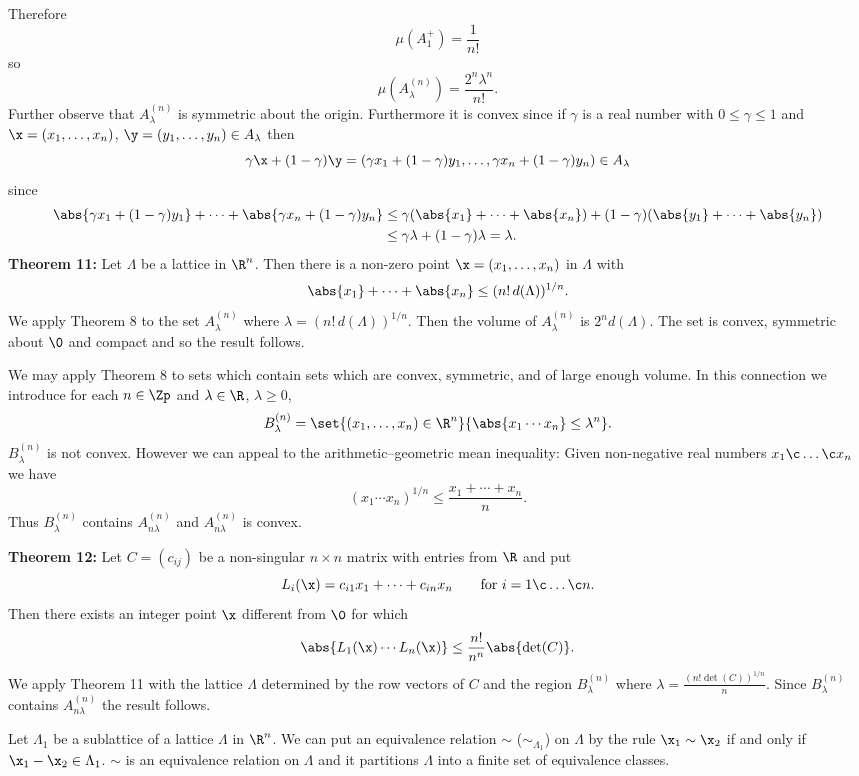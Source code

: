 Therefore
\[ \mu(A^+_1) = \frac{1}{n!} \]
so
\[ \mu(A^{(n)}_\lambda) = \frac{2^n\lambda^n}{n!} . \]
Further observe that $A^{(n)}_\lambda$ is symmetric about the origin.  Furthermore it is convex since if $\gamma$ is a real number with $0\leq\gamma\leq1$ and $\x=(x_1,\dotsc,x_n)$, $\y=(y_1,\dotsc,y_n)\in A_\lambda$ then
\[ \gamma\x+(1-\gamma)\y = (\gamma x_1+(1-\gamma)y_1,\dotsc,\gamma x_n+(1-\gamma)y_n) \in A_\lambda \]
since
\begin{align*}
\abs{\gamma x_1+(1-\gamma)y_1} + \dotsb + \abs{\gamma x_n+(1-\gamma)y_n} &\leq \gamma(\abs{x_1}+\dotsb+\abs{x_n}) + (1-\gamma)(\abs{y_1}+\dotsb+\abs{y_n}) \\
&\leq \gamma\lambda + (1-\gamma)\lambda = \lambda .
\end{align*}
\textbf{Theorem 11:} Let $\Lambda$ be a lattice in $\R^n$.  Then there is a non-zero point $\x=(x_1,\dotsc,x_n)$ in $\Lambda$ with
\[ \abs{x_1} + \dotsb + \abs{x_n} \leq (n!\, d(\Lambda))^{1/n} . \]
\pf We apply Theorem 8 to the set $A^{(n)}_\lambda$ where $\lambda=(n!\,d(\Lambda))^{1/n}$.  Then the volume of $A^{(n)}_\lambda$ is $2^n d(\Lambda)$.  The set is convex, symmetric about $\0$ and compact and so the result follows.

We may apply Theorem 8 to sets which contain sets which are convex, symmetric, and of large enough volume.  In this connection we introduce for each $n\in\Zp$ and $\lambda\in\R$, $\lambda\geq0$,
\[ B^{(n)}_\lambda = \set{(x_1,\dotsc,x_n)\in\R^n}{\abs{x_1\dotsm x_n}\leq\lambda^n} . \]
$B^{(n)}_\lambda$ is not convex.  However we can appeal to the arithmetic--geometric mean inequality: Given non-negative real numbers $x_1\c \dotsc\c x_n$ we have
\[ (x_1\dotsm x_n)^{1/n} \leq \frac{x_1+\dotsb+x_n}{n} . \]
Thus $B^{(n)}_\lambda$ contains $A^{(n)}_{n\lambda}$ and $A^{(n)}_{n\lambda}$ is convex.

\textbf{Theorem 12:} Let $C=(c_{ij})$ be a non-singular $n\times n$ matrix with entries from $\R$ and put
\[ L_i(\x) = c_{i1}x_1 + \dotsb + c_{in}x_n \qquad\text{for $i=1\c \dotsc\c n$} . \]
Then there exists an integer point $\x$ different from $\0$ for which
\[ \abs{L_1(\x)\dotsm L_n(\x)} \leq \frac{n!}{n^n} \abs{\det(C)} . \]
\pf We apply Theorem 11 with the lattice $\Lambda$ determined by the row vectors of $C$ and the region $B^{(n)}_\lambda$ where $\lambda=\frac{(n!\det(C))^{1/n}}{n}$.  Since $B^{(n)}_\lambda$ contains $A^{(n)}_{n\lambda}$ the result follows.

Let $\Lambda_1$ be a sublattice of a lattice $\Lambda$ in $\R^n$.  We can put an equivalence relation $\sim$ ($\sim_{\Lambda_1}$) on $\Lambda$ by the rule $\x_1\sim\x_2$ if and only if $\x_1-\x_2\in\Lambda_1$.  $\sim$ is an equivalence relation on $\Lambda$ and it partitions $\Lambda$ into a finite set of equivalence classes.

